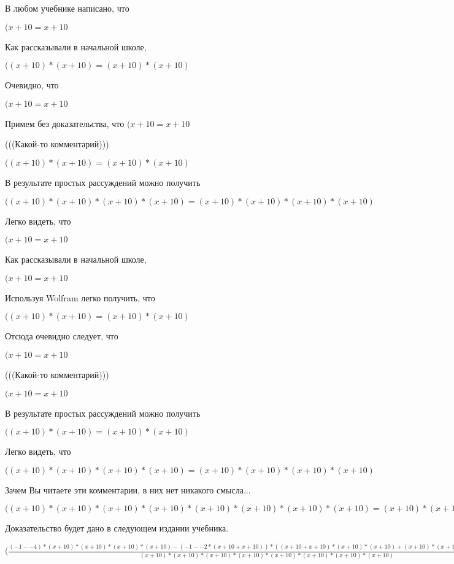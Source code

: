 \documentclass[12pt,a4paper,fleqn]{article}
\theoremstyle{definition}
\begin{document}
В любом учебнике написано, что

$( x  +  10  =  x  +  10 $

Как рассказывали в начальной школе,

$(( x  +  10 ) * ( x  +  10 ) = ( x  +  10 ) * ( x  +  10 )$

Очевидно, что

$( x  +  10  =  x  +  10 $

Примем без доказательства, что
$( x  +  10  =  x  +  10 $

(((Какой-то комментарий)))

$(( x  +  10 ) * ( x  +  10 ) = ( x  +  10 ) * ( x  +  10 )$

В результате простых рассуждений можно получить

$(( x  +  10 ) * ( x  +  10 ) * ( x  +  10 ) * ( x  +  10 ) = ( x  +  10 ) * ( x  +  10 ) * ( x  +  10 ) * ( x  +  10 )$

Легко видеть, что

$( x  +  10  =  x  +  10 $

Как рассказывали в начальной школе,

$( x  +  10  =  x  +  10 $

Используя Wolfram легко получить, что

$(( x  +  10 ) * ( x  +  10 ) = ( x  +  10 ) * ( x  +  10 )$

Отсюда очевидно следует, что

$( x  +  10  =  x  +  10 $

(((Какой-то комментарий)))

$( x  +  10  =  x  +  10 $

В результате простых рассуждений можно получить

$(( x  +  10 ) * ( x  +  10 ) = ( x  +  10 ) * ( x  +  10 )$

Легко видеть, что

$(( x  +  10 ) * ( x  +  10 ) * ( x  +  10 ) * ( x  +  10 ) = ( x  +  10 ) * ( x  +  10 ) * ( x  +  10 ) * ( x  +  10 )$

Зачем Вы читаете эти комментарии, в них нет никакого смысла...

$(( x  +  10 ) * ( x  +  10 ) * ( x  +  10 ) * ( x  +  10 ) * ( x  +  10 ) * ( x  +  10 ) * ( x  +  10 ) * ( x  +  10 ) = ( x  +  10 ) * ( x  +  10 ) * ( x  +  10 ) * ( x  +  10 ) * ( x  +  10 ) * ( x  +  10 ) * ( x  +  10 ) * ( x  +  10 )$

Доказательство будет дано в следующем издании учебника.

$(\frac{( -1  -  -4 ) * ( x  +  10 ) * ( x  +  10 ) * ( x  +  10 ) * ( x  +  10 ) - ( -1  -  -2  * ( x  +  10  +  x  +  10 )) * (( x  +  10  +  x  +  10 ) * ( x  +  10 ) * ( x  +  10 ) + ( x  +  10 ) * ( x  +  10 ) * ( x  +  10  +  x  +  10 ))}{( x  +  10 ) * ( x  +  10 ) * ( x  +  10 ) * ( x  +  10 ) * ( x  +  10 ) * ( x  +  10 ) * ( x  +  10 ) * ( x  +  10 )}
 = \frac{( -1  -  -4 ) * ( x  +  10 ) * ( x  +  10 ) * ( x  +  10 ) * ( x  +  10 ) - ( -1  -  -2  * ( x  +  10  +  x  +  10 )) * (( x  +  10  +  x  +  10 ) * ( x  +  10 ) * ( x  +  10 ) + ( x  +  10 ) * ( x  +  10 ) * ( x  +  10  +  x  +  10 ))}{( x  +  10 ) * ( x  +  10 ) * ( x  +  10 ) * ( x  +  10 ) * ( x  +  10 ) * ( x  +  10 ) * ( x  +  10 ) * ( x  +  10 )}
$
\end{document}
